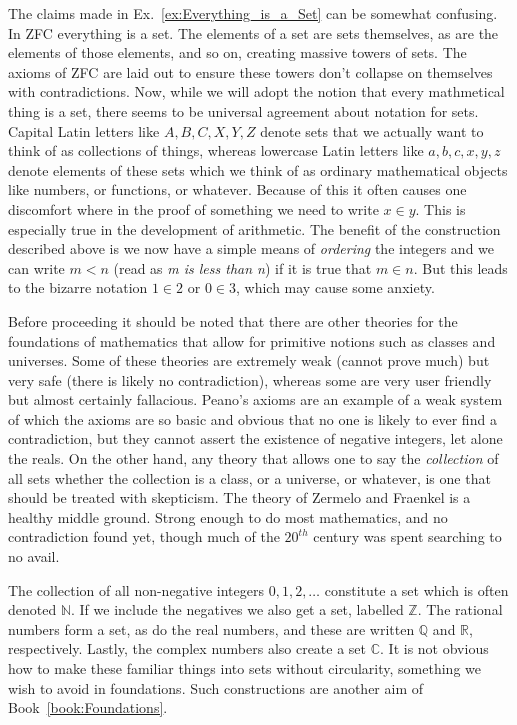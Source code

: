         The claims made in Ex.~\ref{ex:Everything_is_a_Set} can be somewhat
        confusing. In ZFC everything is a set. The elements of a set are sets
        themselves, as are the elements of those elements, and so on,
        creating massive towers of sets. The axioms of ZFC are laid out to
        ensure these towers don't collapse on themselves with contradictions.
        Now, while we will adopt the notion that every mathmetical thing is a
        set, there seems to be universal agreement about notation for sets.
        Capital Latin letters like $A,B,C,X,Y,Z$ denote sets that we actually
        want to think of as collections of things, whereas lowercase Latin
        letters like $a,b,c,x,y,z$ denote elements of these sets which we think
        of as ordinary mathematical objects like numbers, or functions, or
        whatever. Because of this it often causes one discomfort where in the
        proof of something we need to write $x\in{y}$. This is especially true
        in the development of arithmetic. The benefit of the construction
        described above is we now have a simple means of \textit{ordering} the
        integers and we can write $m<n$ (read as \textit{m is less than n}) if
        it is true that $m\in{n}$. But this leads to the bizarre notation
        $1\in{2}$ or $0\in{3}$, which may cause some anxiety.
        \par\hfill\par
        Before proceeding it should be noted that there are other theories for
        the foundations of mathematics that allow for primitive notions such as
        classes and universes. Some of these theories are extremely weak
        (cannot prove much) but very safe (there is likely no contradiction),
        whereas some are very user friendly but almost certainly fallacious.
        Peano's axioms are an example of a weak system of which the axioms are
        so basic and obvious that no one is likely to ever find a
        contradiction, but they cannot assert the existence of negative
        integers, let alone the reals. On the other hand, any theory that
        allows one to say the \textit{collection} of all sets whether the
        collection is a class, or a universe, or whatever, is one that should be
        treated with skepticism. The theory of Zermelo and Fraenkel is a healthy
        middle ground. Strong enough to do most mathematics, and no
        contradiction found yet, though much of the $20^{th}$ century was spent
        searching to no avail.
        \begin{example}
            The collection of all non-negative integers $0,1,2,\dots$ constitute
            a set which is often denoted $\mathbb{N}$. If we include the
            negatives we also get a set, labelled $\mathbb{Z}$. The rational
            numbers form a set, as do the real numbers, and these are written
            $\mathbb{Q}$ and $\mathbb{R}$, respectively. Lastly, the complex
            numbers also create a set $\mathbb{C}$. It is not obvious how to
            make these familiar things into sets without circularity, something
            we wish to avoid in foundations. Such constructions are another aim
            of Book~\ref{book:Foundations}.
        \end{example}
